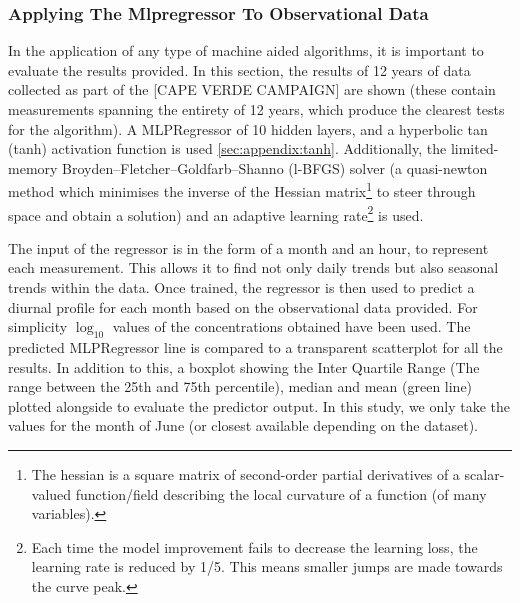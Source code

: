 \subsubsection{Applying The Mlpregressor To Observational Data}
In the application of any type of machine aided algorithms, it is important to evaluate the results provided. In this section, the results of 12 years of data collected as part of the [CAPE VERDE CAMPAIGN] are shown (these contain measurements spanning the entirety of 12 years, which produce the clearest tests for the algorithm). A MLPRegressor of 10 hidden layers, and a hyperbolic tan (tanh) activation function is used \autoref{sec:appendix:tanh}. Additionally, the limited-memory Broyden–Fletcher–Goldfarb–Shanno (l-BFGS) solver (a quasi-newton method which minimises the inverse of the Hessian matrix\footnote{ The hessian is a square matrix of second-order partial derivatives of a scalar-valued function/field describing the local curvature of a function (of many variables).} to steer through space and obtain a solution) and an adaptive learning rate\footnote{Each time the model improvement fails to decrease the learning loss, the learning rate is reduced by 1/5. This means smaller jumps are made towards the curve peak. } is used.

The input of the regressor is in the form of a month and an hour, to represent each measurement. This allows it to find not only daily trends but also seasonal trends within the data. Once trained, the regressor is then used to predict a diurnal profile for each month based on the observational data provided. For simplicity $\log_{10}$ values of the concentrations obtained have been used. The predicted MLPRegressor line is compared to a transparent scatterplot for all the results. In addition to this, a boxplot showing the Inter Quartile Range (The range between the 25th and 75th percentile), median and mean (green line) plotted alongside to evaluate the predictor output. In this study, we only take the values for the month of June (or closest available depending on the dataset).

